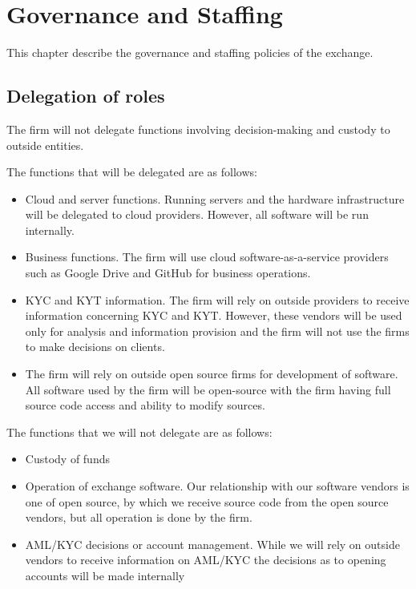 \chapter{Governance and Staffing}

This chapter describe the governance and staffing policies of the
exchange.

\section{Delegation of roles}

The firm will not delegate functions involving decision-making and
custody to outside entities.

The functions that will be delegated are as follows:
\begin{itemize}
  \item Cloud and server functions.  Running servers and the hardware
    infrastructure will be delegated to cloud providers.  However, all
    software will be run internally.
 \item Business functions.  The firm will use cloud software-as-a-service providers such
   as Google Drive and GitHub for business operations.
 \item KYC and KYT information.  The firm will rely on outside
   providers to receive information concerning KYC and KYT.  However,
   these vendors will be used only for analysis and information
   provision and the firm will not use the firms to make decisions on
   clients.
\item The firm will rely on outside open source firms for development
  of software.  All software used by the firm will be open-source with
  the firm having full source code access and ability to modify sources.
\end{itemize}

The functions that we will not delegate are as follows:
\begin{itemize}
\item Custody of funds
  \item Operation of exchange software.  Our relationship with our
    software vendors is one of open source, by which we receive source
    code from the open source vendors, but all operation is done by
    the firm.
 \item AML/KYC decisions or account management.  While we will rely on
   outside vendors to receive information on AML/KYC the decisions as
   to opening accounts will be made internally
\end{itemize}

